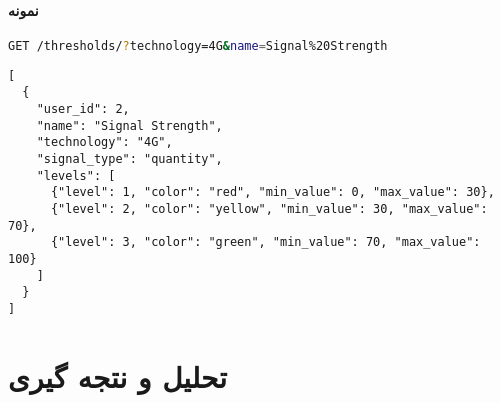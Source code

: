 \documentclass{report}
\begin{document}
\subsubsection{ نمونه}
\begin{latin}
\begin{lstlisting}[style=jsonstyle, language=bash]
GET /thresholds/?technology=4G&name=Signal%20Strength
\end{lstlisting}
\end{latin}
\textbf{}
\begin{latin}
\begin{lstlisting}[style=jsonstyle]
[
  {
    "user_id": 2,
    "name": "Signal Strength",
    "technology": "4G",
    "signal_type": "quantity",
    "levels": [
      {"level": 1, "color": "red", "min_value": 0, "max_value": 30},
      {"level": 2, "color": "yellow", "min_value": 30, "max_value": 70},
      {"level": 3, "color": "green", "min_value": 70, "max_value": 100}
    ]
  }
]
\end{lstlisting}
\end{latin}





\chapter{ }

\section{ }

\section{ }

\chapter{تحلیل و نتجه گیری}
 
\end{document}
